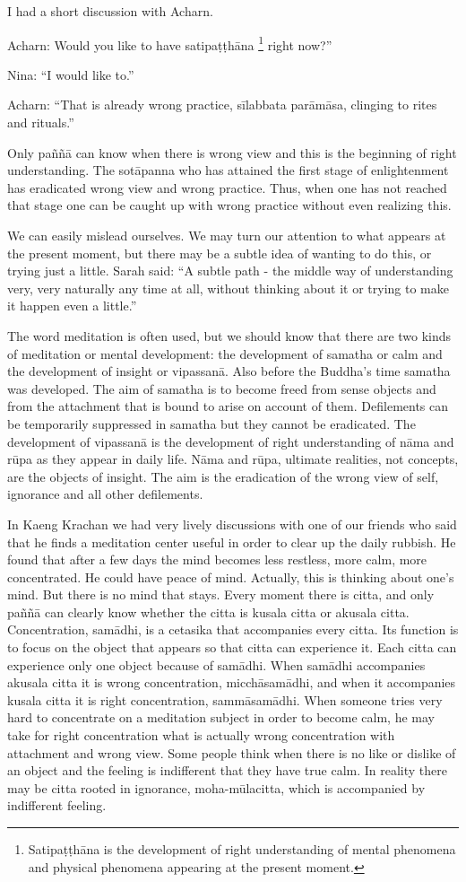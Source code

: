 {{{{{{{I had a short discussion with Acharn.

Acharn: Would you like to have
satipaṭṭhāna
\footnote{Satipaṭṭhāna is the development of
right understanding of mental phenomena and physical phenomena appearing
at the present moment.}
right now?''

Nina: ``I would like to.''

Acharn: ``That is already wrong
practice, sīlabbata parāmāsa, clinging to rites and rituals.''

Only paññā can know when there is wrong
view and this is the beginning of right understanding. The sotāpanna who
has attained the first stage of enlightenment has eradicated wrong view
and wrong practice. Thus, when one has not reached that stage one can be
caught up with wrong practice without even realizing this. 

We can easily mislead ourselves. We may
turn our attention to what appears at the present moment, but there may
be a subtle idea of wanting to do this, or trying just a little. Sarah
said: ``A subtle path - the middle way of understanding very, very
naturally any time at all, without thinking about it or trying to make
it happen even a little.''

The word meditation is often used, but
we should know that there are two kinds of meditation or mental
development: the development of samatha or calm and the development of
insight or vipassanā. Also before the Buddha's time samatha was
developed. The aim of samatha is to become freed from sense objects and
from the attachment that is bound to arise on account of them.
Defilements can be temporarily suppressed in samatha but they cannot be
eradicated. The development of vipassanā is the development of right
understanding of nāma and rūpa as they appear in daily life. Nāma and
rūpa, ultimate realities, not concepts, are the objects of insight. The
aim is the eradication of the wrong view of self, ignorance and all
other defilements. 

In Kaeng
Krachan
we had very lively discussions with
one of our friends who said that he finds a meditation center useful in
order to clear up the daily rubbish. He found that after a few days the
mind becomes less restless, more calm, more concentrated. He could have
peace of mind. Actually, this is thinking about one's mind. But there is
no mind that stays. Every moment there is citta, and only paññā can
clearly know whether the citta is kusala citta or akusala citta.
Concentration, samādhi, is a cetasika that accompanies every citta. Its
function is to focus on the object that appears so that citta can
experience it. Each citta can experience only one object because of
samādhi. When samādhi accompanies akusala citta it is wrong
concentration, micchāsamādhi, and when it accompanies kusala citta it is
right concentration, sammāsamādhi. When someone tries very hard to
concentrate on a meditation subject in order to become calm, he may take
for right concentration what is actually wrong concentration with
attachment and wrong view. Some people think when there is no like or
dislike of an object and the feeling is indifferent that they have true
calm. In reality there may be citta rooted in ignorance, moha-mūlacitta,
which is accompanied by indifferent feeling. 

}}}}}}}

